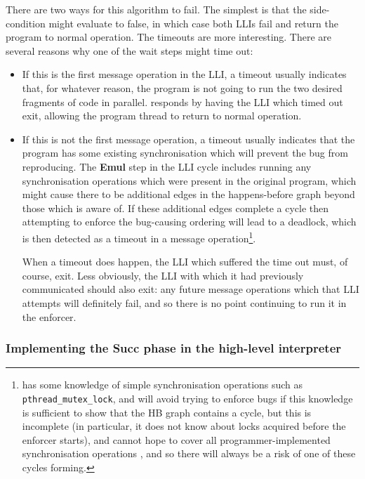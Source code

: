 There are two ways for this algorithm to fail.  The simplest is that
the side-condition might evaluate to false, in which case both LLIs
fail and return the program to normal operation.  The timeouts are
more interesting.  There are several reasons why one of the wait steps
might time out:

\begin{itemize}
\item
  If this is the first message operation in the LLI, a timeout usually
  indicates that, for whatever reason, the program is not going to run
  the two desired fragments of code in parallel.  {\Technique}
  responds by having the LLI which timed out exit, allowing the
  program thread to return to normal operation.

\item
  If this is not the first message operation, a timeout usually
  indicates that the program has some existing synchronisation which
  will prevent the bug from reproducing.  The \textbf{Emul} step in
  the LLI cycle includes running any synchronisation operations which
  were present in the original program, which might cause there to be
  additional edges in the happens-before graph beyond those which
  {\technique} is aware of.  If these additional edges complete a
  cycle then attempting to enforce the bug-causing ordering will lead
  to a deadlock, which is then detected as a timeout in a message
  operation\footnote{{\Technique} has some knowledge of simple
    synchronisation operations such as \texttt{pthread\_mutex\_lock},
    and will avoid trying to enforce bugs if this knowledge is
    sufficient to show that the HB graph contains a cycle, but this is
    incomplete (in particular, it does not know about locks acquired
    before the enforcer starts), and cannot hope to cover all
    programmer-implemented synchronisation operations ,
    and so there will always be a risk of one of these cycles
    forming.}.

  When a timeout does happen, the LLI which suffered the time out
  must, of course, exit.  Less obviously, the LLI with which it had
  previously communicated should also exit: any future message
  operations which that LLI attempts will definitely fail, and so
  there is no point continuing to run it in the enforcer.
\end{itemize}


\subsubsection{Implementing the \textbf{Succ} phase in the high-level interpreter}
\label{sect:enforce:succ}

